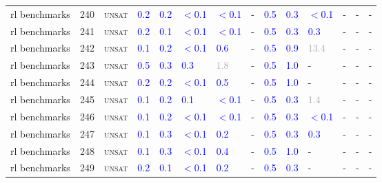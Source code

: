 \begin{center}
{\begin{longtable}{@{}llllllllllllll@{}}
rl benchmarks & 240 & \textsc{unsat} & \textcolor{blue}{0.2} & \textcolor{blue}{0.2} & \textcolor{blue}{$<$0.1} & \textcolor{blue}{$<$0.1} & - & \textcolor{blue}{0.5} & \textcolor{blue}{0.3} & \textcolor{blue}{$<$0.1} & - & - & - \\
rl benchmarks & 241 & \textsc{unsat} & \textcolor{blue}{0.2} & \textcolor{blue}{0.1} & \textcolor{blue}{$<$0.1} & \textcolor{blue}{$<$0.1} & - & \textcolor{blue}{0.5} & \textcolor{blue}{0.3} & \textcolor{blue}{0.3} & - & - & - \\
rl benchmarks & 242 & \textsc{unsat} & \textcolor{blue}{0.1} & \textcolor{blue}{0.2} & \textcolor{blue}{$<$0.1} & \textcolor{blue}{0.6} & - & \textcolor{blue}{0.5} & \textcolor{blue}{0.9} & \textcolor{darkgray}{13.4} & - & - & - \\
rl benchmarks & 243 & \textsc{unsat} & \textcolor{blue}{0.5} & \textcolor{blue}{0.3} & \textcolor{blue}{0.3} & \textcolor{darkgray}{1.8} & - & \textcolor{blue}{0.5} & \textcolor{blue}{1.0} & - & - & - & - \\
rl benchmarks & 244 & \textsc{unsat} & \textcolor{blue}{0.2} & \textcolor{blue}{0.2} & \textcolor{blue}{$<$0.1} & \textcolor{blue}{0.5} & - & \textcolor{blue}{0.5} & \textcolor{blue}{1.0} & - & - & - & - \\
rl benchmarks & 245 & \textsc{unsat} & \textcolor{blue}{0.1} & \textcolor{blue}{0.2} & \textcolor{blue}{0.1} & \textcolor{blue}{$<$0.1} & - & \textcolor{blue}{0.5} & \textcolor{blue}{0.3} & \textcolor{darkgray}{1.4} & - & - & - \\
rl benchmarks & 246 & \textsc{unsat} & \textcolor{blue}{0.1} & \textcolor{blue}{0.2} & \textcolor{blue}{$<$0.1} & \textcolor{blue}{$<$0.1} & - & \textcolor{blue}{0.5} & \textcolor{blue}{0.3} & \textcolor{blue}{$<$0.1} & - & - & - \\
rl benchmarks & 247 & \textsc{unsat} & \textcolor{blue}{0.1} & \textcolor{blue}{0.3} & \textcolor{blue}{$<$0.1} & \textcolor{blue}{0.2} & - & \textcolor{blue}{0.5} & \textcolor{blue}{0.3} & \textcolor{blue}{0.3} & - & - & - \\
rl benchmarks & 248 & \textsc{unsat} & \textcolor{blue}{0.1} & \textcolor{blue}{0.3} & \textcolor{blue}{$<$0.1} & \textcolor{blue}{0.4} & - & \textcolor{blue}{0.5} & \textcolor{blue}{1.0} & - & - & - & - \\
rl benchmarks & 249 & \textsc{unsat} & \textcolor{blue}{0.2} & \textcolor{blue}{0.1} & \textcolor{blue}{$<$0.1} & \textcolor{blue}{0.2} & - & \textcolor{blue}{0.5} & \textcolor{blue}{0.3} & - & - & - & - \\

\end{longtable}}
\end{center}
